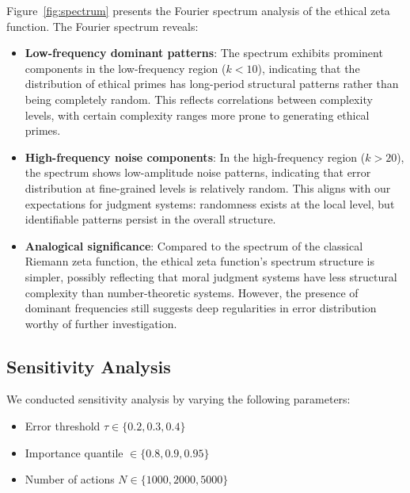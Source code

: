 \documentclass[12pt,a4paper]{article}
\theoremstyle{definition}
\theoremstyle{remark}
\begin{document}
Figure~\ref{fig:spectrum} presents the Fourier spectrum analysis of the ethical zeta function. The Fourier spectrum reveals:
\begin{itemize}
    \item \textbf{Low-frequency dominant patterns}: The spectrum exhibits prominent components in the low-frequency region ($k < 10$), indicating that the distribution of ethical primes has long-period structural patterns rather than being completely random. This reflects correlations between complexity levels, with certain complexity ranges more prone to generating ethical primes.
    \item \textbf{High-frequency noise components}: In the high-frequency region ($k > 20$), the spectrum shows low-amplitude noise patterns, indicating that error distribution at fine-grained levels is relatively random. This aligns with our expectations for judgment systems: randomness exists at the local level, but identifiable patterns persist in the overall structure.
    \item \textbf{Analogical significance}: Compared to the spectrum of the classical Riemann zeta function, the ethical zeta function's spectrum structure is simpler, possibly reflecting that moral judgment systems have less structural complexity than number-theoretic systems. However, the presence of dominant frequencies still suggests deep regularities in error distribution worthy of further investigation.
\end{itemize}

\subsection{Sensitivity Analysis}

We conducted sensitivity analysis by varying the following parameters:
\begin{itemize}
    \item Error threshold $\tau \in \{0.2, 0.3, 0.4\}$
    \item Importance quantile $\in \{0.8, 0.9, 0.95\}$
    \item Number of actions $N \in \{1000, 2000, 5000\}$
\end{itemize}
\end{document}
